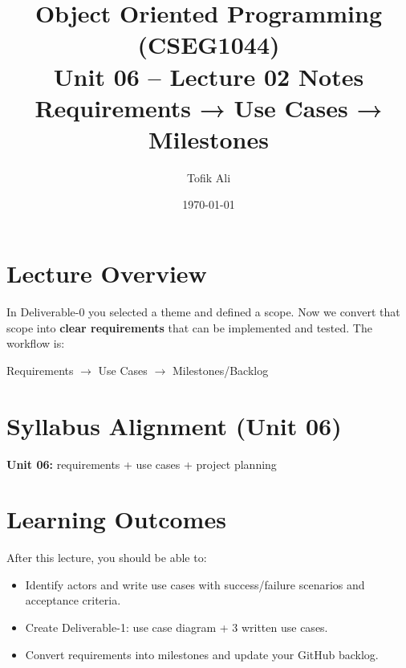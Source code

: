 \documentclass[11pt]{article}
\title{Object Oriented Programming (CSEG1044)\\Unit 06 -- Lecture 02 Notes\\Requirements → Use Cases → Milestones}
\author{Tofik Ali}
\date{\today}
\begin{document}
\maketitle
\tableofcontents

\section{Lecture Overview}
In Deliverable-0 you selected a theme and defined a scope.
Now we convert that scope into \textbf{clear requirements} that can be implemented and tested.
The workflow is:
\begin{center}
Requirements $\rightarrow$ Use Cases $\rightarrow$ Milestones/Backlog
\end{center}
\notesources{\OOPSUnitVISources}

\section{Syllabus Alignment (Unit 06)}
\textbf{Unit 06:} requirements + use cases + project planning

\section{Learning Outcomes}
After this lecture, you should be able to:
\begin{itemize}
  \item Identify actors and write use cases with success/failure scenarios and acceptance criteria.
  \item Create Deliverable-1: use case diagram + 3 written use cases.
  \item Convert requirements into milestones and update your GitHub backlog.
\end{itemize}
\end{document}
